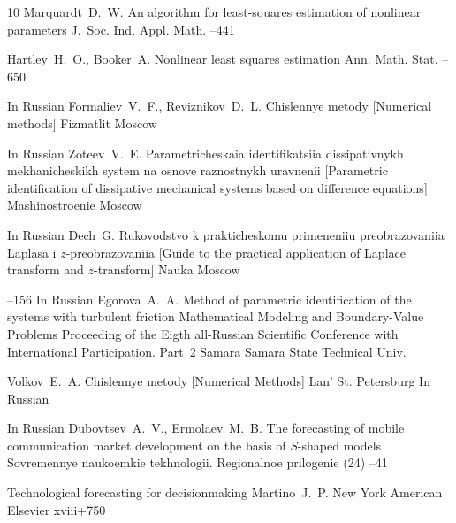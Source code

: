 \begin{thebibliography}{10}
\by Marquardt~D.~W.  
\paper An algorithm for least-squares estimation of nonlinear parameters
\jour J.~Soc. Ind. Appl. Math. 
--441 


\by Hartley~H.~O., Booker~A.  
\paper Nonlinear least squares estimation
\jour Ann. Math. Stat.
--650 



\lang In Russian
\by Formaliev~V.~F., Reviznikov~D.~L. 
\book Chislennye metody \rm [Numerical methods]
\publ Fizmatlit
\publaddr Moscow


\lang In Russian
\by Zoteev~V.~E. 
\book Parametricheskaia identifikatsiia dissipativnykh mekhanicheskikh system na osnove raznostnykh uravnenii \rm [Parametric identification of dissipative mechanical systems based on difference equations]
\publ Mashinostroenie
\publaddr Moscow


\lang In Russian
\by Dech~G. 
\book Rukovodstvo k prakticheskomu primeneniiu preobrazovaniia Laplasa i $z$-preobrazovaniia \rm [Guide to the practical application of Laplace transform and $z$-transform]
\publ Nauka
\publaddr Moscow

--156
\lang In Russian
\by Egorova~A.~A.  
\paper Method of parametric identification of the systems with turbulent friction 
\inbook Mathematical Modeling and Boundary-Value Problems
\bookinfo Proceeding of the Eigth all-Russian Scientific Conference with International Participation. Part~2
\publaddr Samara
\publ Samara State Technical Univ.


\by Volkov~E.~A.  
\book Chislennye metody \rm [Numerical Methods]
\publ  Lan'
\publaddr St. Petersburg
\lang In Russian

\lang In Russian
\by Dubovtsev~A.~V., Ermolaev~M.~B.   
\paper The forecasting of mobile communication market development on the basis of $S$-shaped models
\jour Sovremennye naukoemkie tekhnologii. Regionalnoe prilogenie 
(24)
--41


\book Technological forecasting for decisionmaking 
\by Martino~J.~P. 
\publaddr New York 
\publ  American Elsevier
\totalpages xviii+750 


\end{thebibliography}
